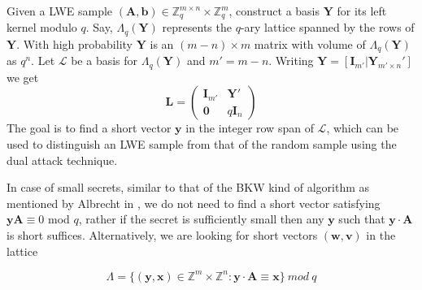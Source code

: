 Given a LWE sample $(\pmb{A},\pmb{b})\in \mathbb{Z}^{m \times n}_q \times \mathbb{Z}_q^{m}$, construct a basis $\pmb{Y}$ for its left kernel modulo $q$. Say, $\Lambda_q(\pmb{Y})$ represents the $q$-ary lattice  spanned by the rows of $\pmb{Y}$. With high probability $\pmb{Y}$ is an $(m-n)\times m$ matrix with volume of $\Lambda_q(\pmb{Y})$ as $q^n$. Let $\mathcal{L}$ be a basis for $\Lambda_q(\pmb{Y})$ and $m'=m-n$. Writing $\pmb{Y}=[\pmb{I}_{m'} |\pmb{Y}_{m'\times n}']$ we get
\begin{equation*}
    \pmb{L}=
    \begin{pmatrix}
        \pmb{I}_{m'} & \pmb{Y}'   \\
        \pmb{0}      & q\pmb{I}_n
    \end{pmatrix}
\end{equation*}
The goal is to find a short vector $\pmb{y}$ in the integer row span of $\mathcal{L}$, which can be used to distinguish an LWE sample from that of the random sample using the dual attack technique.


In case of small secrets, similar to that of the BKW kind of algorithm as mentioned by Albrecht in \cite{albrecht2014lazy}, we do not need to find a short vector satisfying $\pmb{yA} \equiv 0 $ mod $q$, rather if the secret is sufficiently small then any $\pmb{y}$ such that $\pmb{y} \cdot \pmb{A}$ is short suffices. Alternatively, we are looking for short vectors $(\pmb{w},\pmb{v})$ in the lattice

\begin{equation*}
    \Lambda = \{(\pmb{y}, \pmb{x}) \in \mathbb{Z}^m \times \mathbb{Z}^n: \pmb{y} \cdot \pmb{A} \equiv \pmb{x} \}\ mod\ q
\end{equation*}

